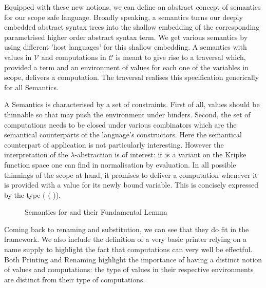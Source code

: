 Equipped with these new notions, we can define an abstract
concept of semantics for our scope safe language. Broadly
speaking, a semantics turns our deeply embedded abstract
syntax trees into the shallow embedding of the corresponding
parametrised higher order abstract syntax term. We get various
semantics by using different 'host languages' for this shallow
embedding. A semantics with values in $\mathcal{V}$ and
computations in $\mathcal{C}$ is meant to give rise to a
traversal which, provided a term and an environment of values
for each one of the variables in scope, delivers a computation.
The traversal  realises this specification generically
for all Semantics.

A Semantics is characterised by a set of constraints. First of all,
values should be thinnable so that  may push the environment
under binders. Second, the set of computations needs to be closed
under various combinators which are the semantical counterparts of
the language's constructors. Here the semantical counterpart of
application is not particularly interesting. However the interpretation
of the $\lambda$-abstraction is of interest: it is a variant on
the Kripke function space one can find in normalisation by evaluation.
In all possible thinnings of the scope at hand, it promises to deliver
a computation whenever it is provided with a value for its newly
bound variable. This is concisely expressed by the type
( (  )).

\begin{figure}[h]
\begin{minipage}{0.45\textwidth}
\end{minipage}\hspace{2em}
\begin{minipage}{0.45\textwidth}
\end{minipage}
\caption{Semantics for  and their Fundamental Lemma}
\end{figure}

Coming back to renaming and substitution, we can see that they do fit
in the  framework. We also include the definition of a very
basic printer relying on a name supply to highlight the fact that
computations can very well be effectful. Both Printing and Renaming
highlight the importance of having a distinct notion of values and
computations: the type of values in their respective environments
are distinct from their type of computations.

